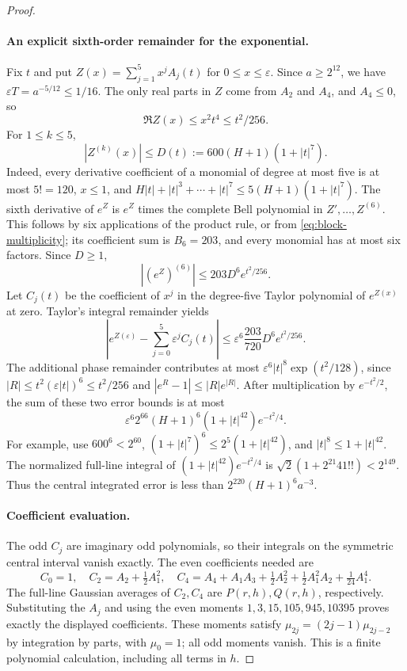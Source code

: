 \begin{proof}
\paragraph{An explicit sixth-order remainder for the exponential.}
Fix $t$ and put $Z(x)=\sum_{j=1}^5x^jA_j(t)$ for $0\le x\le\varepsilon$.
Since $a\ge2^{12}$, we have
$\varepsilon T=a^{-5/12}\le1/16$.  The only real parts in $Z$ come from
$A_2$ and $A_4$, and $A_4\le0$, so
\[
 \Re Z(x)\le x^2t^4\le t^2/256.
\]
For $1\le k\le5$,
\[
 |Z^{(k)}(x)|\le D(t):=600(H+1)(1+|t|^7).
\]
Indeed, every derivative coefficient of a monomial of degree at most five
is at most $5!=120$, $x\le1$, and
$H|t|+|t|^3+\cdots+|t|^7\le5(H+1)(1+|t|^7)$.
The sixth derivative of $e^Z$ is $e^Z$ times the complete Bell polynomial
in $Z',\ldots,Z^{(6)}$.  This follows by six applications of the product
rule, or from \eqref{eq:block-multiplicity}; its coefficient sum is
$B_6=203$, and every monomial has at most six factors.  Since $D\ge1$,
\[
 |(e^Z)^{(6)}|\le203D^6e^{t^2/256}.
\]
Let $C_j(t)$ be the coefficient of $x^j$ in the degree-five Taylor polynomial
of $e^{Z(x)}$ at zero.  Taylor's integral remainder yields
\[
 \left|e^{Z(\varepsilon)}-\sum_{j=0}^5\varepsilon^j C_j(t)\right|
 \le\varepsilon^6\frac{203}{720}D^6e^{t^2/256}.
\]
The additional phase remainder contributes at most
$\varepsilon^6|t|^8\exp(t^2/128)$, since
$|R|\le t^2(\varepsilon|t|)^6\le t^2/256$ and
$|e^R-1|\le|R|e^{|R|}$.  After multiplication by $e^{-t^2/2}$, the sum of
these two error bounds is at most
\begin{equation}\label{eq:mw-integrable-remainder}
 \varepsilon^6 2^{66}(H+1)^6(1+|t|^{42})e^{-t^2/4}.
\end{equation}
For example, use $600^6<2^{60}$,
$(1+|t|^7)^6\le2^5(1+|t|^{42})$, and
$|t|^8\le1+|t|^{42}$.
The normalized full-line integral of
$(1+|t|^{42})e^{-t^2/4}$ is
$\sqrt2(1+2^{21}41!!)<2^{149}$.
Thus the central integrated error is less than
$2^{220}(H+1)^6a^{-3}$.

\paragraph{Coefficient evaluation.}
The odd $C_j$ are imaginary odd polynomials, so their integrals on the
symmetric central interval vanish exactly.  The even coefficients needed are
\[
 C_0=1,\quad C_2=A_2+\tfrac12A_1^2,
 \quad
 C_4=A_4+A_1A_3+\tfrac12A_2^2+\tfrac12A_1^2A_2+\tfrac1{24}A_1^4.
\]
The full-line Gaussian averages of $C_2,C_4$ are $P(r,h),Q(r,h)$,
respectively.  Substituting the $A_j$ and using the even moments
$1,3,15,105,945,10395$ proves exactly the displayed coefficients.
These moments satisfy $\mu_{2j}=(2j-1)\mu_{2j-2}$ by integration by parts,
with $\mu_0=1$; all odd moments vanish.
This is a finite polynomial calculation, including all terms in $h$.


\end{proof}
